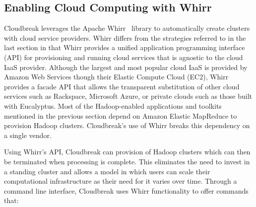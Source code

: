 \subsection{Enabling Cloud Computing with Whirr}

Cloudbreak leverages the Apache Whirr~\cite{whirr} library to automatically create clusters with cloud service providers. Whirr differs from the strategies referred to in the last section in that Whirr provides a unified application programming interface (API) for provisioning and running cloud services that is agnostic to the cloud IaaS provider. Although the largest and most popular cloud IaaS is provided by Amazon Web Services though their Elastic Compute Cloud (EC2), Whirr provides a facade API that allows the transparent substitution of other cloud services such as Rackspace, Microsoft Azure, or private clouds such as those built with Eucalyptus. Most of the Hadoop-enabled applications and toolkits mentioned in the previous section depend on Amazon Elastic MapReduce to provision Hadoop clusters. Cloudbreak's use of Whirr breaks this dependency on a single vendor.

Using Whirr's API, Cloudbreak can provision of Hadoop clusters which can then be terminated when processing is complete. This eliminates the need to invest in a standing cluster and allows a model in which users can scale their computational infrastructure as their need for it varies over time. Through a command line interface, Cloudbreak uses Whirr functionality to offer commands that:

